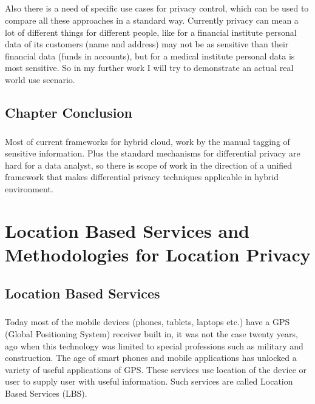 \documentclass{report}
\begin{document}
\paragraph{}
Also there is a need of specific use cases for privacy control, which can be used to compare all these approaches in a standard way. Currently privacy can mean a lot of different things for different people, like for a financial institute personal data of its customers (name and address) may not be as sensitive than their financial data (funds in accounts), but for a medical institute personal data is most sensitive. So in my further work I will try to demonstrate an actual real world use scenario.



\section{Chapter Conclusion}
\paragraph{}
Most of current frameworks for hybrid cloud, work by the manual tagging of sensitive information. Plus the standard mechanisms for differential privacy are hard for a data analyst, so there is scope of work in the direction of a unified framework that makes differential privacy techniques applicable in hybrid environment. 






\chapter{Location Based Services and Methodologies for Location Privacy}
\section{Location Based Services}
\paragraph{}
Today most of the mobile devices (phones, tablets, laptops etc.) have a GPS (Global Positioning System) receiver built in, it was not the case twenty years, ago when this technology was limited to special professions such as military and construction. The age of smart phones and mobile applications has unlocked a variety of useful applications of GPS. These services use location of the device or user to supply user with useful information. Such services are called Location Based Services (LBS).
\end{document}
